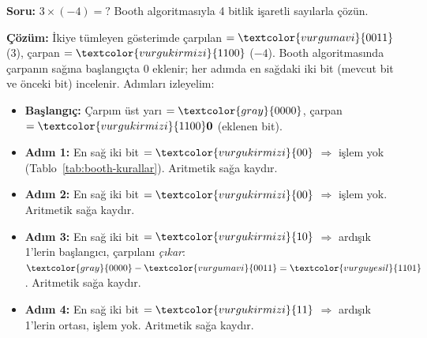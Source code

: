 \begin{ornek}[5.7]
\textbf{Soru:} $3 \times (-4) = ?$ \quad Booth algoritmasıyla 4 bitlik işaretli sayılarla çözün.

\textbf{Çözüm:} İkiye tümleyen gösterimde çarpılan $= \textcolor{vurgumavi}{0011}$ (3), çarpan $= \textcolor{vurgukirmizi}{1100}$ ($-4$). Booth algoritmasında çarpanın sağına başlangıçta $0$ eklenir; her adımda en sağdaki iki bit (mevcut bit ve önceki bit) incelenir. Adımları izleyelim:

\begin{itemize}[nosep]
\item \textbf{Başlangıç:} Çarpım üst yarı $= \textcolor{gray}{0000}$, çarpan $= \textcolor{vurgukirmizi}{1100}\mathbf{0}$ (eklenen bit).
\item \textbf{Adım 1:} En sağ iki bit $= \textcolor{vurgukirmizi}{00}$ $\Rightarrow$ işlem yok (Tablo~\ref{tab:booth-kurallar}). Aritmetik sağa kaydır.
\item \textbf{Adım 2:} En sağ iki bit $= \textcolor{vurgukirmizi}{00}$ $\Rightarrow$ işlem yok. Aritmetik sağa kaydır.
\item \textbf{Adım 3:} En sağ iki bit $= \textcolor{vurgukirmizi}{10}$ $\Rightarrow$ ardışık 1'lerin başlangıcı, çarpılanı \emph{çıkar}: $\textcolor{gray}{0000} - \textcolor{vurgumavi}{0011} = \textcolor{vurguyesil}{1101}$. Aritmetik sağa kaydır.
\item \textbf{Adım 4:} En sağ iki bit $= \textcolor{vurgukirmizi}{11}$ $\Rightarrow$ ardışık 1'lerin ortası, işlem yok. Aritmetik sağa kaydır.
\end{itemize}


\end{ornek}
